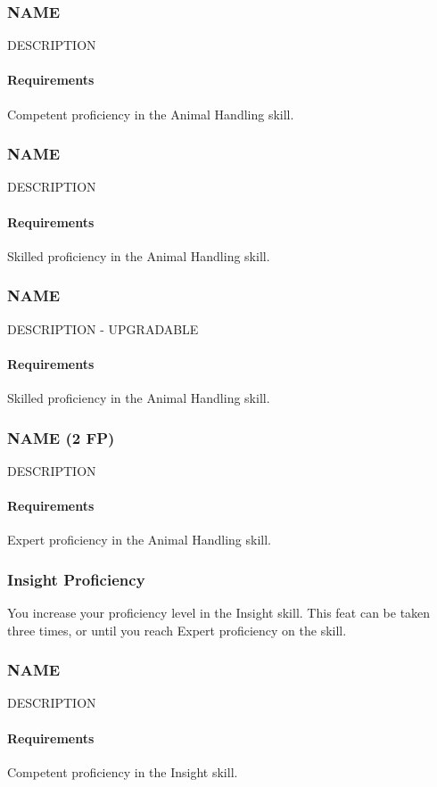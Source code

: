 \subsubsection{NAME} \label{feat::name}
    DESCRIPTION
    \paragraph{Requirements} Competent proficiency in the Animal Handling skill.
\subsubsection{NAME} \label{feat::name}
    DESCRIPTION
    \paragraph{Requirements} Skilled proficiency in the Animal Handling skill.
\subsubsection{NAME} \label{feat::name}
    DESCRIPTION - UPGRADABLE
    \paragraph{Requirements} Skilled proficiency in the Animal Handling skill.
\subsubsection{NAME (2 FP)} \label{feat::name}
    DESCRIPTION
    \paragraph{Requirements} Expert proficiency in the Animal Handling skill.
\subsubsection{Insight Proficiency} \label{feat::insightprof}
    You increase your proficiency level in the Insight skill.
    This feat can be taken three times, or until you reach Expert proficiency on the skill.
\subsubsection{NAME} \label{feat::name}
    DESCRIPTION
    \paragraph{Requirements} Competent proficiency in the Insight skill.
